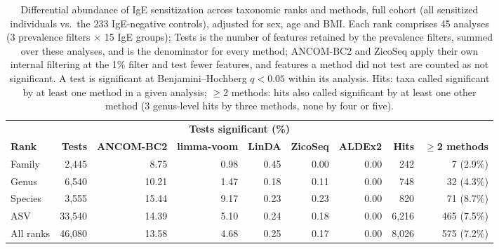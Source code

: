 \begin{table}[h!]
\centering
\small
\setlength{\tabcolsep}{4pt}
\begin{tabular}{l r r r r r r r r}
 & & \multicolumn{5}{c}{\textbf{Tests significant (\%)}} & & \\
\textbf{Rank} & \textbf{Tests} & \textbf{ANCOM-BC2} & \textbf{limma-voom} & \textbf{LinDA} & \textbf{ZicoSeq} & \textbf{ALDEx2} & \textbf{Hits} & \textbf{$\geq$2 methods} \\
\hline
Family & 2,445 & 8.75 & 0.98 & 0.45 & 0.00 & 0.00 & 242 & 7 (2.9\%) \\
Genus & 6,540 & 10.21 & 1.47 & 0.18 & 0.11 & 0.00 & 748 & 32 (4.3\%) \\
Species & 3,555 & 15.44 & 9.17 & 0.23 & 0.23 & 0.00 & 820 & 71 (8.7\%) \\
ASV & 33,540 & 14.39 & 5.10 & 0.24 & 0.18 & 0.00 & 6,216 & 465 (7.5\%) \\
\hline
All ranks & 46,080 & 13.58 & 4.68 & 0.25 & 0.17 & 0.00 & 8,026 & 575 (7.2\%) \\
\hline
\end{tabular}
\caption{Differential abundance of IgE sensitization across taxonomic ranks and methods, full cohort (all sensitized individuals vs.\ the 233 IgE-negative controls), adjusted for sex, age and BMI. Each rank comprises 45 analyses (3 prevalence filters $\times$ 15 IgE groups); Tests is the number of features retained by the prevalence filters, summed over these analyses, and is the denominator for every method; ANCOM-BC2 and ZicoSeq apply their own internal filtering at the 1\% filter and test fewer features, and features a method did not test are counted as not significant. A test is significant at Benjamini--Hochberg $q < 0.05$ within its analysis. Hits: taxa called significant by at least one method in a given analysis; $\geq$2 methods: hits also called significant by at least one other method (3 genus-level hits by three methods, none by four or five).\label{tab:da_ranks}}
\end{table}
